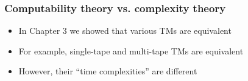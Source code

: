 



\begin{frame}[allowframebreaks] \frametitle{Computability theory vs. complexity theory}
    \begin{itemize}
\item In Chapter 3 we showed that various TMs are equivalent
\item For example, single-tape and multi-tape TMs are equivalent
\item However, their ``time complexities'' are different
\end{itemize}\end{frame}


